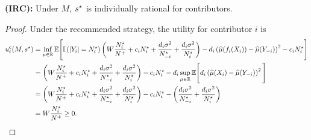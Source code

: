 \noindent
\textbf{(IRC):} Under $M$, $s^\star$ is individually rational for contributors.
\begin{proof}
    Under the recommended strategy, the utility for contributor $i$ is 
    \begin{align*}
        u^{\rm c}_{i}(M,s^{\star})
        &=
        \inf_{\mu\in\mathbb{R}}
        \mathbb{E}\Bigg[
            \mathbb{I}\left( \left| Y_i \right| = N_i^{\star} \right) 
            \left(
                W \frac{N_i^{\star}}{N^{+}} + c_i N_i^{\star}  +  \frac{d_i\sigma^2}{N_{-i}^{\star}} +  \frac{d_i\sigma^2}{ N_i^{\star}} 
            \right)
            -  d_i\left(
                \widehat{\mu}(f_i(X_{i}))-\widehat{\mu}(Y_{-i})
            \right)^2
            -c_iN^\star_i
        \Bigg]
        \\
        &=
            \left(
                W \frac{N_i^{\star}}{N^{+}} + c_i N_i^{\star}  +  \frac{d_i\sigma^2}{N_{-i}^{\star}} +  \frac{d_i\sigma^2}{ N_i^{\star}} 
            \right)
            -c_iN^\star_i
        -d_i \sup_{\mu\in\mathbb{R}}
        \mathbb{E}\Bigg[
          d_i\left(
            \widehat{\mu}(X_{i})-\widehat{\mu}(Y_{-i})
        \right)^2
        \Bigg]
        \\
        &=
            \left(
                W \frac{N_i^{\star}}{N^{+}} + c_i N_i^{\star}  +  \frac{d_i\sigma^2}{N_{-i}^{\star}} +  \frac{d_i\sigma^2}{ N_i^{\star}} 
            \right)
            -c_iN^\star_i
        -\left(
            \frac{d_i\sigma^2}{N_{-i}^{\star}} +  \frac{d_i\sigma^2}{ N_i^{\star}} 
        \right)
        \\
        &=
        W \frac{N_i^{\star}}{N^{+}} 
        \geq 0 .
    \end{align*}

    
\end{proof}

